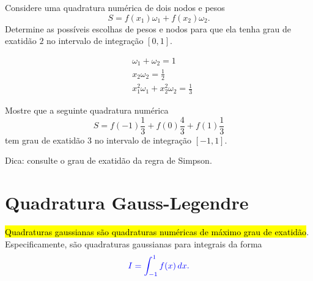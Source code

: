 \begin{exer}
  Considere uma quadratura numérica de dois nodos e pesos
  \begin{equation}
    S = f(x_1)\omega_1 + f(x_2)\omega_2.
  \end{equation}
  Determine as possíveis escolhas de pesos e nodos para que ela tenha grau de exatidão $2$ no intervalo de integração $[0,1]$.
\end{exer}
\begin{resp}
  \begin{align}
    &\omega_1 + \omega_2 = 1\\
    &x_2\omega_2 = \frac{1}{2}\\
    &x_1^2\omega_1 + x_2^2\omega_2 = \frac{1}{3}
  \end{align}
\end{resp}

\begin{exer}
  Mostre que a seguinte quadratura numérica
  \begin{equation}
    S = f(-1)\frac{1}{3} + f(0)\frac{4}{3} + f(1)\frac{1}{3}
  \end{equation}
  tem grau de exatidão $3$ no intervalo de integração $[-1, 1]$.
\end{exer}
\begin{resp}
  Dica: consulte o grau de exatidão da regra de Simpson.
\end{resp}

\section{Quadratura Gauss-Legendre}\label{cap_integr_sec_Gauss-Legendre}

\hl{Quadraturas gaussianas são quadraturas numéricas de máximo grau de exatidão}. Especificamente,  são quadraturas gaussianas para integrais da forma
\begin{equation}\color{blue}I = \int_{-1}^1 f(x)\,dx.
\end{equation}

